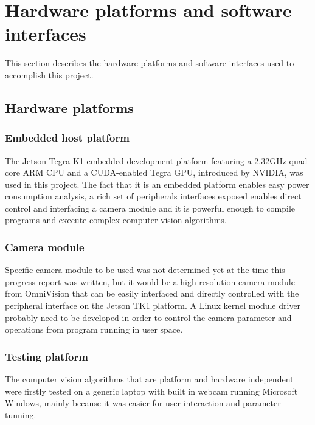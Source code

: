 \chapter{Hardware platforms and software interfaces}

This section describes the hardware platforms and software interfaces used to accomplish this project.

\section{Hardware platforms}

\subsection{Embedded host platform}

The Jetson Tegra K1 embedded development platform \cite{NVIDIA:tk1} featuring a 2.32GHz quad-core ARM CPU and a CUDA-enabled Tegra GPU, introduced by NVIDIA, was used in this project. The fact that it is an embedded platform enables easy power consumption analysis, a rich set of peripherals interfaces exposed enables direct control and interfacing a camera module and it is powerful enough to compile programs and execute complex computer vision algorithms.

\subsection{Camera module}
\label{hwsw:camera}

Specific camera module to be used was not determined yet at the time this progress report was written, but it would be a high resolution camera module from OmniVision \cite{ovt} that can be easily interfaced and directly controlled with the peripheral interface on the Jetson TK1 platform. A Linux kernel module driver probably need to be developed in order to control the camera parameter and operations from program running in user space.

\subsection{Testing platform}

The computer vision algorithms that are platform and hardware independent were firstly tested on a generic laptop with built in webcam running Microsoft Windows, mainly because it was easier for user interaction and parameter tunning.

